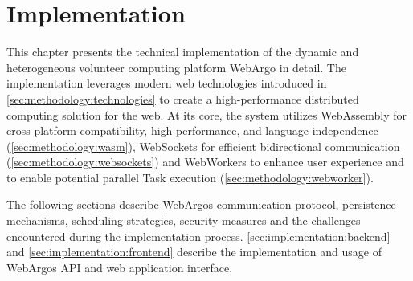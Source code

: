\chapter{Implementation}
\label{ch:implementation}
This chapter presents the technical implementation of the dynamic and heterogeneous volunteer computing platform WebArgo in detail. The implementation leverages modern web technologies introduced in \autoref{sec:methodology:technologies} to create a high-performance distributed computing solution for the web. At its core, the system utilizes WebAssembly for cross-platform compatibility, high-performance, and language independence (\autoref{sec:methodology:wasm}), WebSockets for efficient bidirectional communication (\autoref{sec:methodology:websockets}) and WebWorkers to enhance user experience and to enable potential parallel Task execution (\autoref{sec:methodology:webworker}).

The following sections describe WebArgos communication protocol, persistence mechanisms, scheduling strategies, security measures and the challenges encountered during the implementation process. \autoref{sec:implementation:backend} and \autoref{sec:implementation:frontend} describe the implementation and usage of WebArgos \ac{API} and web application interface.

